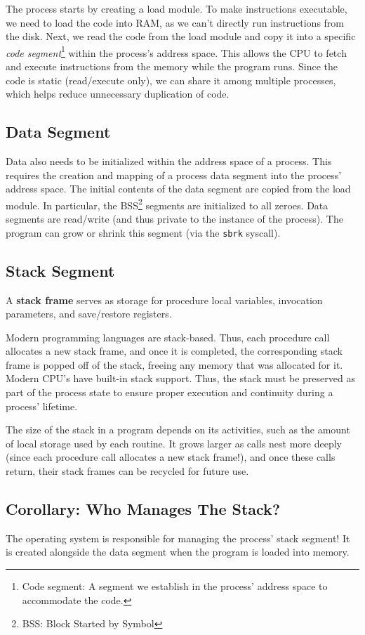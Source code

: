 \documentclass{report}
\newcommand{\definitionBegin}[1]{\begin{tcolorbox}[title={Definition: #1}]}
\newcommand{\definitionEnd}{\end{tcolorbox}}
\begin{document}
The process starts by creating a load module. To make instructions executable, we need to load the
code into RAM, as we can't directly run instructions from the disk. Next, we read the code from the
load module and copy it into a specific \textit{code segment}\footnote{Code segment: A segment we
  establish in the process' address space to accommodate the code.} within the process's address
space. This allows the CPU to fetch and execute instructions from the memory while the program
runs. Since the code is static (read/execute only), we can
share it among multiple processes, which helps reduce unnecessary duplication of code. 


\subsection{Data Segment}
Data also needs to be initialized within the address space of a process. This requires the creation
and mapping of a process data segment into the process' address space. The initial contents of the
data segment are copied from the load module. In particular, the BSS\footnote{BSS: Block Started by
  Symbol} segments are initialized to all zeroes. Data segments are read/write (and thus private to
the instance of the process). The program can grow or shrink this segment (via the \texttt{sbrk}
syscall).


\subsection{Stack Segment}
\definitionBegin{Stack Frame}
A \textbf{stack frame} serves as storage for procedure local variables, invocation parameters, and
save/restore registers.
\definitionEnd

Modern programming languages are stack-based. Thus, each procedure call allocates a new stack
frame, and once it is completed, the corresponding stack frame is popped off of the stack, freeing
any memory that was allocated for it. Modern CPU's have built-in stack support. Thus, the stack must
be preserved as part of the process state to ensure proper execution and continuity during a
process' lifetime.

The size of the stack in a program depends on its activities, such as the amount of local storage
used by each routine. It grows larger as calls nest more deeply (since each procedure call allocates
a new stack frame!), and once these calls return, their stack frames can be recycled for future use.


\subsection*{Corollary: Who Manages The Stack?}
The operating system is responsible for managing the process' stack segment! It is created alongside
the data segment when the program is loaded into memory.
\end{document}

